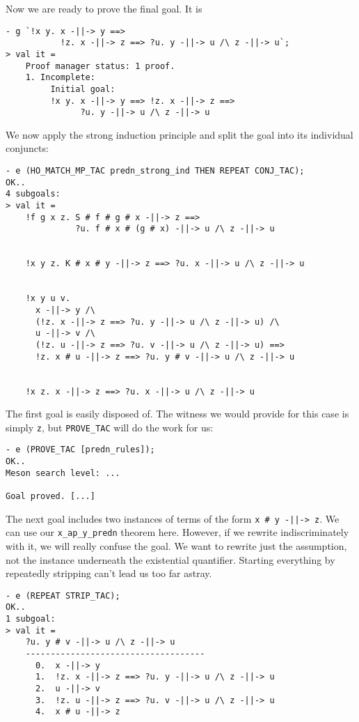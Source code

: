 \noindent Now we are ready to prove the final goal.  It is
\begin{session}
\begin{verbatim}
- g `!x y. x -||-> y ==>
           !z. x -||-> z ==> ?u. y -||-> u /\ z -||-> u`;
> val it =
    Proof manager status: 1 proof.
    1. Incomplete:
         Initial goal:
         !x y. x -||-> y ==> !z. x -||-> z ==>
               ?u. y -||-> u /\ z -||-> u
\end{verbatim}
\end{session}
We now apply the strong induction principle and split the goal into
its individual conjuncts:
\begin{session}
\begin{verbatim}
- e (HO_MATCH_MP_TAC predn_strong_ind THEN REPEAT CONJ_TAC);
OK..
4 subgoals:
> val it =
    !f g x z. S # f # g # x -||-> z ==>
              ?u. f # x # (g # x) -||-> u /\ z -||-> u


    !x y z. K # x # y -||-> z ==> ?u. x -||-> u /\ z -||-> u


    !x y u v.
      x -||-> y /\
      (!z. x -||-> z ==> ?u. y -||-> u /\ z -||-> u) /\
      u -||-> v /\
      (!z. u -||-> z ==> ?u. v -||-> u /\ z -||-> u) ==>
      !z. x # u -||-> z ==> ?u. y # v -||-> u /\ z -||-> u


    !x z. x -||-> z ==> ?u. x -||-> u /\ z -||-> u
\end{verbatim}
\end{session}
The first goal is easily disposed of.  The witness we would provide
for this case is simply \texttt{z}, but \texttt{PROVE\_TAC} will do
the work for us:
\begin{session}
\begin{verbatim}
- e (PROVE_TAC [predn_rules]);
OK..
Meson search level: ...

Goal proved. [...]
\end{verbatim}
\end{session}
    The next goal includes two instances of terms of the form
    \verb!x # y -||-> z!.  We can use our \verb!x_ap_y_predn!
    theorem here.  However, if we rewrite indiscriminately with it, we
    will really confuse the goal.  We want to rewrite just the
    assumption, not the instance underneath the existential
    quantifier.  Starting everything by repeatedly stripping can't
    lead us too far astray.
\begin{session}
\begin{verbatim}
- e (REPEAT STRIP_TAC);
OK..
1 subgoal:
> val it =
    ?u. y # v -||-> u /\ z -||-> u
    ------------------------------------
      0.  x -||-> y
      1.  !z. x -||-> z ==> ?u. y -||-> u /\ z -||-> u
      2.  u -||-> v
      3.  !z. u -||-> z ==> ?u. v -||-> u /\ z -||-> u
      4.  x # u -||-> z
\end{verbatim}
\end{session}
